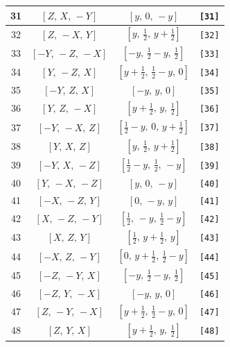\documentclass[fleqn,8pt]{jsarticle}
\begin{document}
\begin{longtable}{cccc}
31 & $\left[ Z,\, X,\, - Y \right]$ & $\left[ y,\, 0,\, - y \right]$ & {\tt [31]} \\ \hline
32 & $\left[ Z,\, - X,\, Y \right]$ & $\left[ y,\, \frac{1}{2},\, y + \frac{1}{2} \right]$ & {\tt [32]} \\ \hline
33 & $\left[ - Y,\, - Z,\, - X \right]$ & $\left[ - y,\, \frac{1}{2} - y,\, \frac{1}{2} \right]$ & {\tt [33]} \\ \hline
34 & $\left[ Y,\, - Z,\, X \right]$ & $\left[ y + \frac{1}{2},\, \frac{1}{2} - y,\, 0 \right]$ & {\tt [34]} \\ \hline
35 & $\left[ - Y,\, Z,\, X \right]$ & $\left[ - y,\, y,\, 0 \right]$ & {\tt [35]} \\ \hline
36 & $\left[ Y,\, Z,\, - X \right]$ & $\left[ y + \frac{1}{2},\, y,\, \frac{1}{2} \right]$ & {\tt [36]} \\ \hline
37 & $\left[ - Y,\, - X,\, Z \right]$ & $\left[ \frac{1}{2} - y,\, 0,\, y + \frac{1}{2} \right]$ & {\tt [37]} \\ \hline
38 & $\left[ Y,\, X,\, Z \right]$ & $\left[ y,\, \frac{1}{2},\, y + \frac{1}{2} \right]$ & {\tt [38]} \\ \hline
39 & $\left[ - Y,\, X,\, - Z \right]$ & $\left[ \frac{1}{2} - y,\, \frac{1}{2},\, - y \right]$ & {\tt [39]} \\ \hline
40 & $\left[ Y,\, - X,\, - Z \right]$ & $\left[ y,\, 0,\, - y \right]$ & {\tt [40]} \\ \hline
41 & $\left[ - X,\, - Z,\, Y \right]$ & $\left[ 0,\, - y,\, y \right]$ & {\tt [41]} \\ \hline
42 & $\left[ X,\, - Z,\, - Y \right]$ & $\left[ \frac{1}{2},\, - y,\, \frac{1}{2} - y \right]$ & {\tt [42]} \\ \hline
43 & $\left[ X,\, Z,\, Y \right]$ & $\left[ \frac{1}{2},\, y + \frac{1}{2},\, y \right]$ & {\tt [43]} \\ \hline
44 & $\left[ - X,\, Z,\, - Y \right]$ & $\left[ 0,\, y + \frac{1}{2},\, \frac{1}{2} - y \right]$ & {\tt [44]} \\ \hline
45 & $\left[ - Z,\, - Y,\, X \right]$ & $\left[ - y,\, \frac{1}{2} - y,\, \frac{1}{2} \right]$ & {\tt [45]} \\ \hline
46 & $\left[ - Z,\, Y,\, - X \right]$ & $\left[ - y,\, y,\, 0 \right]$ & {\tt [46]} \\ \hline
47 & $\left[ Z,\, - Y,\, - X \right]$ & $\left[ y + \frac{1}{2},\, \frac{1}{2} - y,\, 0 \right]$ & {\tt [47]} \\ \hline
48 & $\left[ Z,\, Y,\, X \right]$ & $\left[ y + \frac{1}{2},\, y,\, \frac{1}{2} \right]$ & {\tt [48]} \\
\end{longtable}
\end{document}
